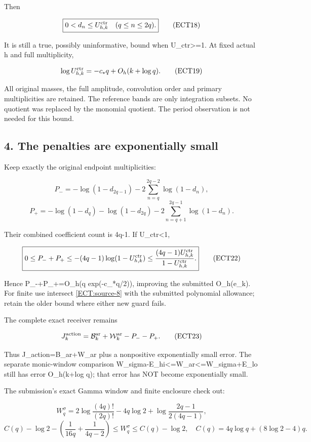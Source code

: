 \documentclass[11pt,a4paper]{article}
\begin{document}
Then

\[
\boxed{0<d_n\le U_{h,k}^{\rm ctr}\quad(q\le n\le2q).}
\tag{ECT18}\label{ECT:source-7}\]

It is still a true, possibly uninformative, bound when U\_ctr\textgreater=1. At fixed actual h and full multiplicity,

\[
\log U_{h,k}^{\rm ctr}=-c_*q+O_h(k+\log q).
\tag{ECT19}\label{ECT:eq-19}\]

All original masses, the full amplitude, convolution order and primary multiplicities are retained. The reference bands are only integration subsets. No quotient was replaced by the monomial quotient. The period observation is not needed for this bound.

\subsection{4. The penalties are exponentially small}\label{ECT:the-penalties-are-exponentially-small}

Keep exactly the original endpoint multiplicities:

\[
P_-=-\log(1-d_{2q-1})-2\sum_{n=q}^{2q-2}\log(1-d_n),
\tag{ECT20}\label{ECT:eq-20}\] \[
P_+=-\log(1-d_q)-\log(1-d_{2q})-2\sum_{n=q+1}^{2q-1}\log(1-d_n).
\tag{ECT21}\label{ECT:eq-21}\]

Their combined coefficient count is 4q-1. If U\_ctr\textless1,

\[
\boxed{0\le P_-+P_+\le-(4q-1)\log(1-U_{h,k}^{\rm ctr})
\le\frac{(4q-1)U_{h,k}^{\rm ctr}}{1-U_{h,k}^{\rm ctr}}.}
\tag{ECT22}\label{ECT:source-8}\]

Hence P\_-+P\_+=O\_h(q exp(-c\_*q/2)), improving the submitted O\_h(e\_k). For finite use intersect \eqref{ECT:source-8} with the submitted polynomial allowance; retain the older bound where either new guard fails.

The complete exact receiver remains

\[
J_k^{\rm action}=\mathcal B_k^{\rm ar}+\mathcal W_k^{\rm ar}-P_--P_+.
\tag{ECT23}\label{ECT:eq-23}\]

Thus J\_action=B\_ar+W\_ar plus a nonpositive exponentially small error. The separate monic-window comparison W\_sigma-E\_hi\textless=W\_ar\textless=W\_sigma+E\_lo still has error O\_h(k+log q); that error has NOT become exponentially small.

The submission's exact Gamma window and finite enclosure check out:

\[
W_q^\sigma=2\log\frac{(4q)!}{(2q)!}-4q\log2+\log\frac{2q-1}{2(4q-1)},
\tag{ECT24}\label{ECT:eq-24}\] \[
C(q)-\log2-\left(\frac1{16q}+\frac1{4q-2}\right)\le W_q^\sigma\le C(q)-\log2,
\quad C(q)=4q\log q+(8\log2-4)q.
\tag{ECT25}\label{ECT:eq-25}\]
\end{document}

